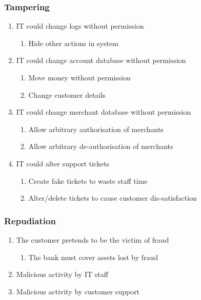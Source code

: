 \subsubsection{Tampering}

\begin{enumerate}
    \item IT could change logs without permission
    \begin{enumerate}
        \item Hide other actions in system
    \end{enumerate}

    \item IT could change account database without permission
    \begin{enumerate}
        \item Move money without permission
        \item Change customer details
    \end{enumerate}

    \item IT could change merchant database without permission
    \begin{enumerate}
        \item Allow arbitrary authorisation of merchants
        \item Allow arbitrary de-authorisation of merchants
    \end{enumerate}

    \item IT could alter support tickets
    \begin{enumerate}
        \item Create fake tickets to waste staff time
        \item Alter/delete tickets to cause customer dis-satisfaction
    \end{enumerate}
\end{enumerate}

\subsubsection{Repudiation}

\begin{enumerate}
    \item The customer pretends to be the victim of fraud
    \begin{enumerate}
        \item The bank must cover assets lost by fraud
    \end{enumerate}

    \item Malicious activity by IT staff
    \item Malicious activity by customer support
\end{enumerate}

